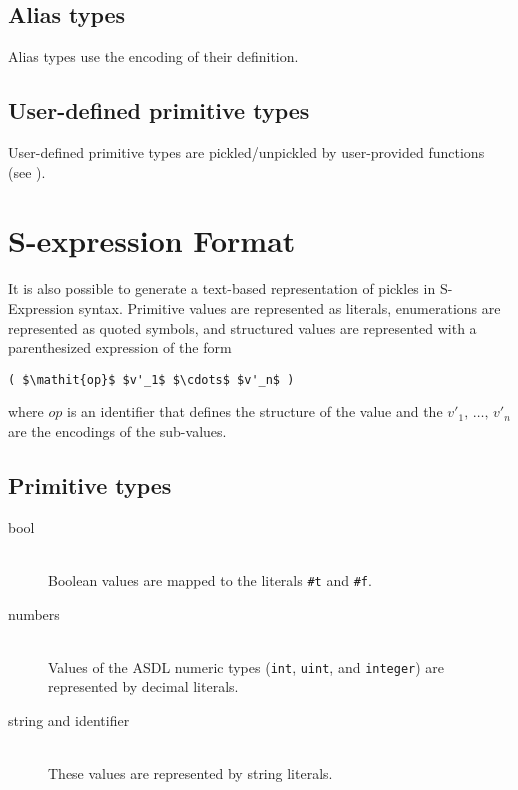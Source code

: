 \subsection{Alias types}
Alias types use the encoding of their definition.

\subsection{User-defined primitive types}
User-defined primitive types are pickled/unpickled by user-provided functions (see
).

\section{S-expression Format}
It is also possible to generate a text-based representation of pickles in S-Expression
syntax.  Primitive values are represented as literals, enumerations are represented
as quoted symbols, and structured values are represented with a parenthesized
expression of the form
\begin{code}\begin{lstlisting}[mathescape=true]
( $\mathit{op}$ $v'_1$ $\cdots$ $v'_n$ )
\end{lstlisting}\end{code}%
where $\mathit{op}$ is an identifier that defines the structure of the value
and the $v'_1,\,\ldots,\,v'_n$ are the encodings of the sub-values.

\subsection{Primitive types}

\begin{description}
  \item[bool] \mbox{}\\
    Boolean values are mapped to the literals \lstinline!#t! and \lstinline!#f!.
    
  \item[numbers] \mbox{}\\
    Values of the ASDL numeric types (\lstinline!int!, \lstinline!uint!, and
    \lstinline!integer!) are represented by decimal literals.

  \item[string and identifier] \mbox{}\\
    These values are represented by string literals.
\end{description}%

